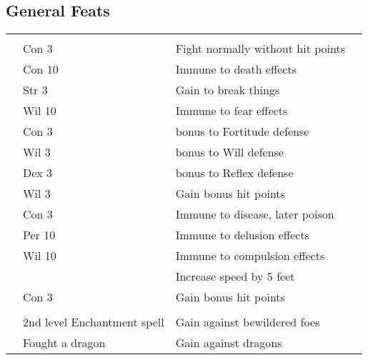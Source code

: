 \subsection{General Feats}
{\small
    \begin{longtabu}{>{\lcol}p{10em} >{\lcol}p{15em} >{\lcol}X >{\lcol}p{3em}}
         &  &  &  \\
         & Con 3 & Fight normally without hit points &  \\
         & Con 10 & Immune to death effects &  \\
         & Str 3 & Gain  to break things &  \\
         & Wil 10 & Immune to fear effects &  \\
         & Con 3 &  bonus to Fortitude defense &  \\
         & Wil 3 &  bonus to Will defense &  \\
         & Dex 3 &   bonus to Reflex defense &  \\
         & Wil 3 & Gain bonus hit points &  \\
         & Con 3 & Immune to disease, later poison &  \\
         & Per 10 & Immune to delusion effects &  \\
         & Wil 10 & Immune to compulsion effects &  \\
         & \x & Increase speed by 5 feet &  \\
         & Con 3 & Gain bonus hit points &  \\

        \midrule
         &  &  &  \\
         & 2nd level Enchantment spell & Gain  against bewildered foes &  \\
         & Fought a dragon & Gain  against dragons &  \\


\end{longtabu}}
